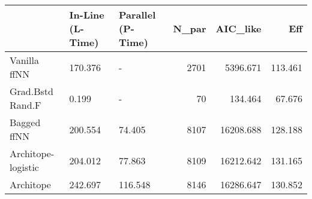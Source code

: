 \begin{tabular}{lllrrr}
\toprule
{} & In-Line (L-Time) & Parallel (P-Time) &  N\_par &   AIC\_like &      Eff \\
\midrule
Vanilla ffNN       &          170.376 &                 - &   2701 &   5396.671 &  113.461 \\
Grad.Bstd Rand.F   &            0.199 &                 - &     70 &    134.464 &   67.676 \\
Bagged ffNN        &          200.554 &            74.405 &   8107 &  16208.688 &  128.188 \\
Architope-logistic &          204.012 &            77.863 &   8109 &  16212.642 &  131.165 \\
Architope          &          242.697 &           116.548 &   8146 &  16286.647 &  130.852 \\
\bottomrule
\end{tabular}
